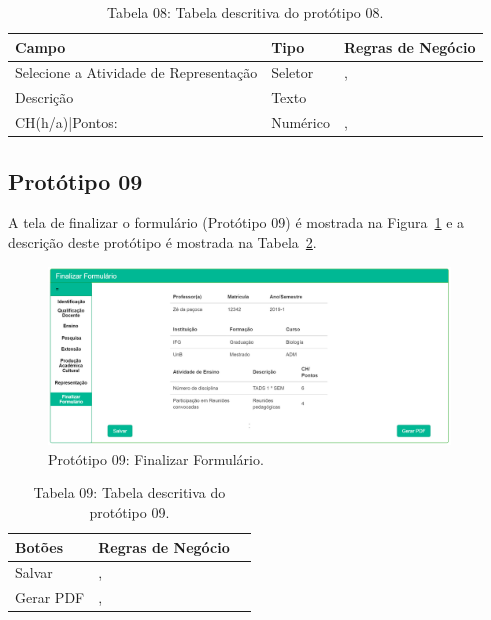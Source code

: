 \begin{table}[H]
\centering
\caption[Tabela 08: Tabela descritiva do protótipo 08.]{Tabela 08: Tabela descritiva do protótipo 08.}
\label{tab:prot08}
\begin{tabular}{@{}lll@{}}
\toprule
Campo                                   & Tipo     &  Regras de Negócio     \\ \midrule
Selecione a Atividade de Representação  & Seletor  &    \nameref{rn011}, \nameref{rn019}\\
Descrição                               & Texto    &    \nameref{rn011}                 \\
CH(h/a)|Pontos:                         & Numérico &    \nameref{rn011}, \nameref{rn020}\\ \bottomrule
\end{tabular}
\end{table}

\newpage
\subsection{Protótipo 09}\label{prototipo09}
A tela de finalizar o formulário (Protótipo 09) é mostrada na Figura~\ref{fig:prot09} e a descrição deste protótipo é mostrada na Tabela~\ref{tab:prot09}.


\begin{figure}[H]
    \centering
    \includegraphics[width=0.95\textwidth]{img/9pagina_finalizar_formulario.png}
    \caption[Protótipo 09: Finalizar Formulário]{Protótipo 09: Finalizar Formulário.}
    \label{fig:prot09}
\end{figure}


\begin{table}[H]
\centering
\caption[Tabela 09: Tabela descritiva do protótipo 09.]{Tabela 09: Tabela descritiva do protótipo 09.}
\label{tab:prot09}
\begin{tabular}{@{}lll@{}}
\toprule
Botões      &  Regras de Negócio                                \\ \midrule
Salvar      &     \nameref{rn012}, \nameref{rn015}              \\
Gerar PDF   &     \nameref{rn012}, \nameref{rn014}              \\ \bottomrule
\end{tabular}
\end{table}



